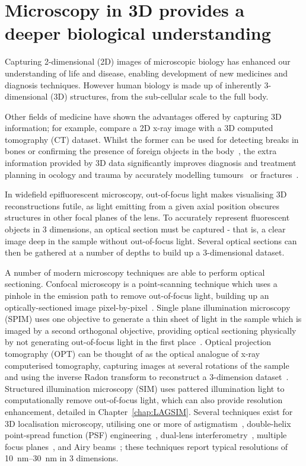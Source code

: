 \section{Microscopy in 3D provides a deeper biological understanding}
Capturing 2-dimensional (2D) images of microscopic biology has enhanced our understanding of life and disease, enabling development of new medicines and diagnosis techniques. 
However human biology is made up of inherently 3-dimensional (3D) structures, from the sub-cellular scale to the full body. 

Other fields of medicine have shown the advantages offered by capturing 3D information; for example, compare a 2D x-ray image with a 3D computed tomography (CT) dataset. 
Whilst the former can be used for detecting breaks in bones or confirming the presence of foreign objects in the body~\cite{markose2009three}, the extra information provided by 3D data significantly improves diagnosis and treatment planning in ocology and trauma by accurately modelling tumours~\cite{zhang2013thin} or fractures~\cite{rangarajan2013three}. 

In widefield epifluorescent microscopy, out-of-focus light makes visualising 3D reconstructions futile, as light emitting from a given axial position obscures structures in other focal planes of the lens. 
To accurately represent fluorescent objects in 3 dimensions, an optical section must be captured - that is, a clear image deep in the sample without out-of-focus light.
Several optical sections can then be gathered at a number of depths to build up a 3-dimensional dataset. 

A number of modern microscopy techniques are able to perform optical sectioning. 
Confocal microscopy is a point-scanning technique which uses a pinhole in the emission path to remove out-of-focus light, building up an optically-sectioned image pixel-by-pixel~\cite{white1987evaluation, marvin1961microscopy}. 
Single plane illumination microscopy (SPIM) uses one objective to generate a thin sheet of light in the sample which is imaged by a second orthogonal objective, providing optical sectioning physically by not generating out-of-focus light in the first place~\cite{huisken2004optical}. 
Optical projection tomography (OPT) can be thought of as the optical analogue of x-ray computerised tomography, capturing images at several rotations of the sample and using the inverse Radon transform to reconstruct a 3-dimension dataset~\cite{sharpe2002optical}. 
Structured illumination microscopy (SIM) uses pattered illumination light to computationally remove out-of-focus light, which can also provide resolution enhancement, detailed in Chapter~\ref{chap:LAGSIM}. 
Several techniques exist for 3D localisation microscopy, utilising one or more of astigmatism~\cite{huang2008three}, double-helix point-spread function (PSF) engineering~\cite{pavani2009three}, dual-lens interferometry~\cite{shtengel2009interferometric}, multiple focus planes~\cite{toprak2007three}, and Airy beams~\cite{jia2014isotropic}; these techniques report typical resolutions of \SIrange[range-phrase=--]{10}{30}{\nano\metre} in 3 dimensions. 

